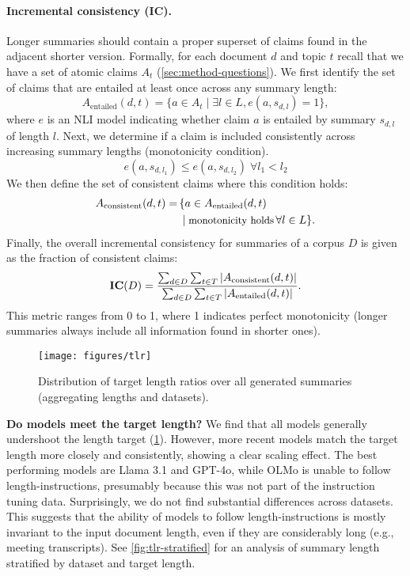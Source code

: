 \paragraph{Incremental consistency (IC).}
Longer summaries should contain a proper superset of claims found in the adjacent shorter version.
Formally, for each document $d$ and topic $t$ recall that we have a set of atomic claims $A_t$ (\cref{sec:method-questions}).
We first identify the set of claims that are entailed at least once across any summary length:
%
\begin{equation*}
    A_{\text{entailed}}(d,t) = \{a \in A_t \mid \exists l \in L, e(a,s_{d,l}) = 1\},
\end{equation*}
%
where $e$ is an NLI model indicating whether claim $a$ is entailed by summary $s_{d,l}$ of length $l$.
Next, we determine if a claim is included consistently across increasing summary lengths (monotonicity condition).
%
\begin{equation*}
    e(a,s_{d,l_1}) \leq e(a,s_{d,l_2}) \; \forall l_1 < l_2
\end{equation*}
%
We then define the set of consistent claims where this condition holds:
%
\begin{equation*}
\begin{aligned}
    A_{\text{consistent}}(d,t) =\,&\{a \in A_{\text{entailed}}(d,t) \\
    \quad& \mid \text{\small monotonicity holds} \, \forall l \in L \}.
\end{aligned}
\end{equation*}
%
Finally, the overall incremental consistency for summaries of a corpus $D$ is given as the fraction of consistent claims:
%
\begin{equation}
\text{\textbf{IC}}(D) = \frac{
        \sum_{d \in D} \sum_{t \in T} |A_{\text{consistent}}(d,t)|
    }{
        \sum_{d \in D} \sum_{t \in T} |A_{\text{entailed}}(d,t)|
    }.
\end{equation}
%
This metric ranges from 0 to 1, where 1 indicates perfect monotonicity (longer summaries always include all information found in shorter ones).

\begin{figure}[t]
\texttt{[image: figures/tlr]}
\caption{Distribution of target length ratios over all generated summaries (aggregating lengths and datasets).}
\label{fig:length-deviation}
\end{figure}

\noindent\textbf{Do models meet the target length?}
We find that all models generally undershoot the length target (\cref{fig:length-deviation}).
However, more recent models match the target length more closely and consistently, showing a clear scaling effect.
The best performing models are Llama 3.1 and GPT-4o, while OLMo is unable to follow length-instructions, presumably because this was not part of the instruction tuning data.
Surprisingly, we do not find substantial differences across datasets.
This suggests that the ability of models to follow length-instructions is mostly invariant to the input document length, even if they are considerably long (e.g., meeting transcripts).
See \cref{fig:tlr-stratified} for an analysis of summary length stratified by dataset and target length.

